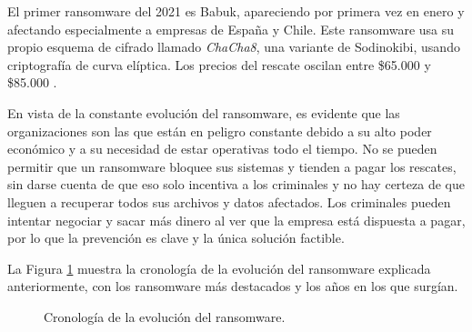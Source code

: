 El primer ransomware del 2021 es Babuk, apareciendo por primera vez en enero y afectando especialmente a empresas de España y Chile. Este ransomware usa su propio esquema de cifrado llamado \textit{ChaCha8}, una variante de Sodinokibi, usando criptografía de curva elíptica. Los precios del rescate oscilan entre \$65.000 y \$85.000 \cite{73}.

En vista de la constante evolución del ransomware, es evidente que las organizaciones son las que están en peligro constante debido a su alto poder económico y a su necesidad de estar operativas todo el tiempo. No se pueden permitir que un ransomware bloquee sus sistemas y tienden a pagar los rescates, sin darse cuenta de que eso solo incentiva a los criminales y no hay certeza de que lleguen a recuperar todos sus archivos y datos afectados. Los criminales pueden intentar negociar y sacar más dinero al ver que la empresa está dispuesta a pagar, por lo que la prevención es clave y la única solución factible. 

La Figura \ref{fig:crono} muestra la cronología de la evolución del ransomware explicada anteriormente, con los ransomware más destacados y los años en los que surgían.
\newpage
\begin{figure}[h!]
\begin{center}
{}
\end{center}
\caption{Cronología de la evolución del ransomware.}
\label{fig:crono}
\end{figure}


